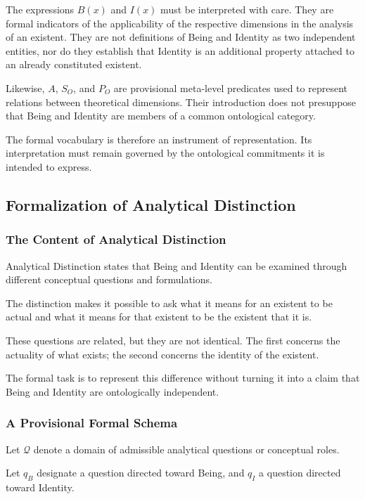 The expressions \(B(x)\) and \(I(x)\) must be interpreted
with care. They are formal indicators of the applicability
of the respective dimensions in the analysis of an existent.
They are not definitions of Being and Identity as two
independent entities, nor do they establish that Identity
is an additional property attached to an already constituted
existent.

Likewise, \(A\), \(S_O\), and \(P_O\) are provisional
meta-level predicates used to represent relations between
theoretical dimensions. Their introduction does not
presuppose that Being and Identity are members of a
common ontological category.

The formal vocabulary is therefore an instrument of
representation. Its interpretation must remain governed
by the ontological commitments it is intended to express.

\subsection{Formalization of Analytical Distinction}

\subsubsection{The Content of Analytical Distinction}

Analytical Distinction states that Being and Identity
can be examined through different conceptual questions
and formulations.

The distinction makes it possible to ask what it means
for an existent to be actual and what it means for that
existent to be the existent that it is.

These questions are related, but they are not identical.
The first concerns the actuality of what exists; the
second concerns the identity of the existent.

The formal task is to represent this difference without
turning it into a claim that Being and Identity are
ontologically independent.

\subsubsection{A Provisional Formal Schema}

Let \(\mathcal{Q}\) denote a domain of admissible analytical
questions or conceptual roles.

Let \(q_B\) designate a question directed toward Being,
and \(q_I\) a question directed toward Identity.

